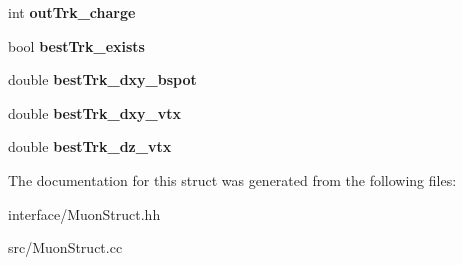 \begin{DoxyCompactItemize}
\item 
\hypertarget{structran_1_1MuonStruct_a58dc3402fde305d06acd86449811c4c1}{int {\bfseries out\-Trk\-\_\-charge}}\label{structran_1_1MuonStruct_a58dc3402fde305d06acd86449811c4c1}

\item 
\hypertarget{structran_1_1MuonStruct_ad581563fb43f247732faf3a68465c8c0}{bool {\bfseries best\-Trk\-\_\-exists}}\label{structran_1_1MuonStruct_ad581563fb43f247732faf3a68465c8c0}

\item 
\hypertarget{structran_1_1MuonStruct_addafb3644a63febae06934f3c99ca096}{double {\bfseries best\-Trk\-\_\-dxy\-\_\-bspot}}\label{structran_1_1MuonStruct_addafb3644a63febae06934f3c99ca096}

\item 
\hypertarget{structran_1_1MuonStruct_aa87351db95884e37556cf7030a86bccc}{double {\bfseries best\-Trk\-\_\-dxy\-\_\-vtx}}\label{structran_1_1MuonStruct_aa87351db95884e37556cf7030a86bccc}

\item 
\hypertarget{structran_1_1MuonStruct_abb9ab8ee0219e1db5c72d3c7e8dcb835}{double {\bfseries best\-Trk\-\_\-dz\-\_\-vtx}}\label{structran_1_1MuonStruct_abb9ab8ee0219e1db5c72d3c7e8dcb835}

\end{DoxyCompactItemize}


The documentation for this struct was generated from the following files\-:\begin{DoxyCompactItemize}
\item 
interface/Muon\-Struct.\-hh\item 
src/Muon\-Struct.\-cc\end{DoxyCompactItemize}
